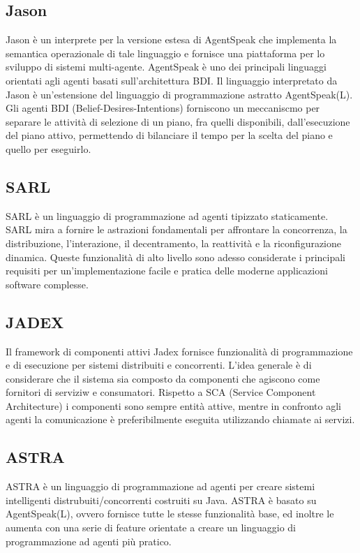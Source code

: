 \subsection{Jason}
Jason \`e un interprete per la versione estesa di AgentSpeak che implementa la semantica operazionale di tale linguaggio e fornisce una piattaforma per lo sviluppo di sistemi multi-agente. AgentSpeak \`e uno dei principali linguaggi orientati agli agenti basati sull'architettura BDI. Il linguaggio interpretato da Jason \`e un'estensione del linguaggio di programmazione astratto AgentSpeak(L).
Gli agenti BDI (Belief-Desires-Intentions) forniscono un meccaniscmo per separare le attivit\`a di selezione di un piano, fra quelli disponibili, dall'esecuzione del piano attivo, permettendo di bilanciare il tempo per la scelta del piano e quello per eseguirlo.

\subsection{SARL}
SARL \`e un linguaggio di programmazione ad agenti tipizzato staticamente. SARL mira a fornire le astrazioni fondamentali per affrontare la concorrenza, la distribuzione, l'interazione, il decentramento, la reattivit\`a e la riconfigurazione dinamica. Queste funzionalit\`a di alto livello sono adesso considerate i principali requisiti per un'implementazione facile e pratica delle moderne applicazioni software complesse.

\subsection{JADEX}
Il framework di componenti attivi Jadex fornisce funzionalit\`a di programmazione e di esecuzione per sistemi distribuiti e concorrenti. L'idea generale \`e di considerare che il sistema sia composto da componenti che agiscono come fornitori di serviziw e consumatori.
Rispetto a SCA (Service Component Architecture) i componenti sono sempre entit\`a attive, mentre in confronto agli agenti la comunicazione \`e preferibilmente eseguita utilizzando chiamate ai servizi.

\subsection{ASTRA}
ASTRA \`e un linguaggio di programmazione ad agenti per creare sistemi intelligenti distrubuiti/concorrenti costruiti su Java.
ASTRA \`e basato su AgentSpeak(L), ovvero fornisce tutte le stesse funzionalit\`a base, ed inoltre le aumenta con una serie di feature orientate a creare un linguaggio di programmazione ad agenti pi\`u pratico.


